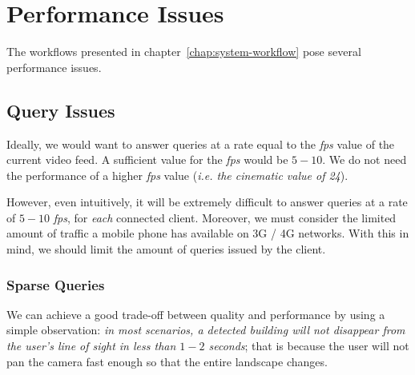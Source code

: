 \documentclass[a4paper,onecolumn,oneside,titlepage,11pt]{report}
\begin{document}
\chapter{Performance Issues}
\label{chap:performance-issues}
The workflows presented in chapter~\ref{chap:system-workflow} pose several performance issues.
\section{Query Issues}
Ideally, we would want to answer queries at a rate equal to the \emph{fps} value of the current video feed. A sufficient value for the \emph{fps} would be $5-10$. We do not need the performance of a higher \emph{fps} value (\emph{i.e. the cinematic value of 24}).

However, even intuitively, it will be extremely difficult to answer queries at a rate of $5-10$ \emph{fps}, for \emph{each} connected client. Moreover, we must consider the limited amount of traffic a mobile phone has available on 3G / 4G networks. With this in mind, we should limit the amount of queries issued by the client.

\subsection{Sparse Queries}
We can achieve a good trade-off between quality and performance by using a simple observation: \emph{in most scenarios, a detected building will not disappear from the user's line of sight in less than $1-2$ seconds}; that is because the user will not pan the camera fast enough so that the entire landscape changes.
\end{document}
